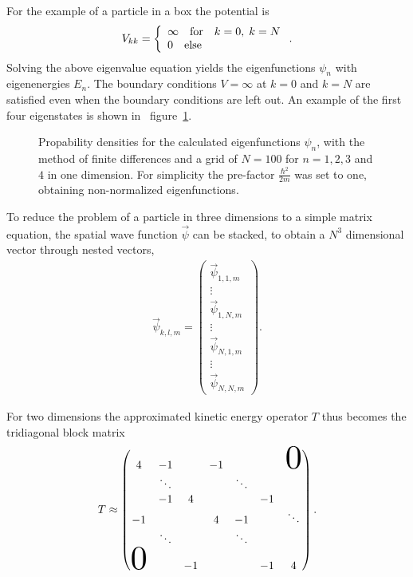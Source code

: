 \documentclass[twoside,        %
			   12pt,			%
               BCOR10mm,       %
               ngerman,english  %
               ]{scrartcl}
\begin{document}
\par For the example of a particle in a box the potential is
\begin{align} 
V_{kk} = \left\{ \begin{array}{ll}  \infty  \quad \text{for} \quad  k = 0, \; k= N \\  0 \quad \text{else} \end{array} \right. \text.
\end{align}
Solving the above eigenvalue equation yields the eigenfunctions $\psi_n$ with eigenenergies $E_n$. The boundary conditions $V = \infty$ at $k=0$ and $k=N$ are satisfied even when the boundary conditions are left out. An example of the first four eigenstates is shown in \mbox{ figure \ref{fig:eigenfunctions}.}
\begin{figure}[!htb]
	\Huge
	\centering
	\resizebox{!}{0.4\textwidth}{}
	\caption{Propability densities for the calculated eigenfunctions $\psi_n$, with the method of finite differences and a grid of $N=100$ for $n = 1,2,3$ and $4$ in one dimension. For simplicity the pre-factor $\frac{\hbar^2}{2m}$ was set to one, obtaining non-normalized eigenfunctions.}
	\label{fig:eigenfunctions}
\end{figure} 
To reduce the problem of a particle in three dimensions to a simple matrix equation, the spatial wave function $\vec{\psi}$ can be stacked, to obtain a $N^3$ dimensional vector through nested vectors,
\begin{align}
\vec{\psi}_{k,l,m} = \begin{pmatrix}\vec{\psi}_{1,1,m} \\ \vdots \\ \vec{\psi}_{1,N,m} \\ \vdots \\ \vec{\psi}_{N,1,m} \\ \vdots \\ \vec{\psi}_{N,N,m} \end{pmatrix}.
\end{align}

For two dimensions the approximated kinetic energy operator $T$ thus becomes the tridiagonal block matrix
\begin{align}
T \approx  \begin{pmatrix}
4	& -1	&  &  -1	 &     &     &  \scalebox{3}{$0$}  \\
    & \ddots	&     & 		&   \ddots   & 	& \\
    & -1 & 4 &  &  &-1 \\
-1 &      &          & 4     & -1       & & \ddots \\
    & \ddots &     &&    \ddots   &       &  \\
  \scalebox{3}{$0$}   &      & -1       &&         & -1     & 4 \\ 
\end{pmatrix} \text{.}
\end{align}
\end{document}
